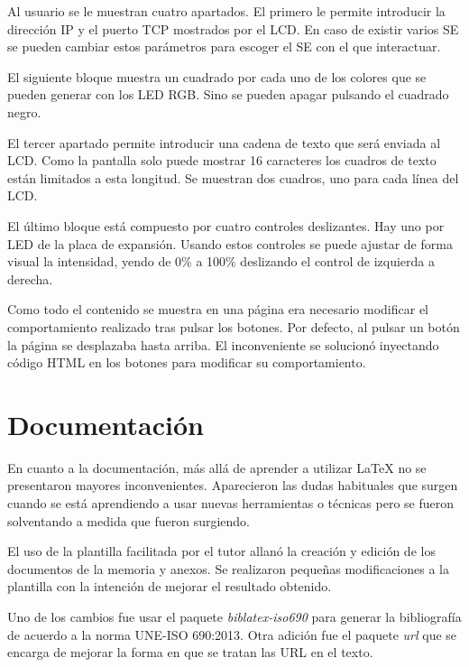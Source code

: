 Al usuario se le muestran cuatro apartados. El primero le permite introducir la
dirección IP y el puerto TCP mostrados por el LCD. En caso de existir varios SE
se pueden cambiar estos parámetros para escoger el SE con el que interactuar.

El siguiente bloque muestra un cuadrado por cada uno de los colores que se
pueden generar con los LED RGB. Sino se pueden apagar pulsando el cuadrado
negro.

El tercer apartado permite introducir una cadena de texto que será enviada al
LCD. Como la pantalla solo puede mostrar 16 caracteres los cuadros de texto
están limitados a esta longitud. Se muestran dos cuadros, uno para cada línea
del LCD.

El último bloque está compuesto por cuatro controles deslizantes. Hay uno por
LED de la placa de expansión. Usando estos controles se puede ajustar de forma
visual la intensidad, yendo de 0\% a 100\% deslizando el control de izquierda
a derecha.

Como todo el contenido se muestra en una página era necesario modificar el
comportamiento realizado tras pulsar los botones. Por defecto, al pulsar un
botón la página se desplazaba hasta arriba. El inconveniente se solucionó
inyectando código HTML en los botones para modificar su comportamiento.

\section{Documentación}{\label{sec:documentacion}}
En cuanto a la documentación, más allá de aprender a utilizar \LaTeX{} no se
presentaron mayores inconvenientes. Aparecieron las dudas habituales que surgen
cuando se está aprendiendo a usar nuevas herramientas o técnicas pero se fueron
solventando a medida que fueron surgiendo.

El uso de la plantilla facilitada por el tutor allanó la creación y edición de 
los documentos de la memoria y anexos. Se realizaron pequeñas modificaciones a
la plantilla con la intención de mejorar el resultado obtenido. 

Uno de los cambios fue usar el paquete \emph{biblatex-iso690} para generar la
bibliografía de acuerdo a la norma UNE-ISO 690:2013. Otra adición fue el
paquete \emph{url} que se encarga de mejorar la forma en que se tratan las URL
en el texto.
